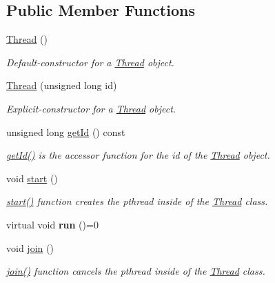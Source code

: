 \subsection*{Public Member Functions}
\begin{DoxyCompactItemize}
\item 
\hyperlink{class_thread_a95c703fb8f2f27cb64f475a8c940864a}{Thread} ()
\begin{DoxyCompactList}\small\item\em Default-\/constructor for a \hyperlink{class_thread}{Thread} object. \end{DoxyCompactList}\item 
\hyperlink{class_thread_a4b0b62961ddc8eedec7be379118d0588}{Thread} (unsigned long id)
\begin{DoxyCompactList}\small\item\em Explicit-\/constructor for a \hyperlink{class_thread}{Thread} object. \end{DoxyCompactList}\item 
unsigned long \hyperlink{class_thread_aca302203fb0d46f6ea42bb49f689f6a6}{get\+Id} () const
\begin{DoxyCompactList}\small\item\em \hyperlink{class_thread_aca302203fb0d46f6ea42bb49f689f6a6}{get\+Id()} is the accessor function for the id of the \hyperlink{class_thread}{Thread} object. \end{DoxyCompactList}\item 
void \hyperlink{class_thread_a1f53ee62bd30a7924186ef26150ce262}{start} ()
\begin{DoxyCompactList}\small\item\em \hyperlink{class_thread_a1f53ee62bd30a7924186ef26150ce262}{start()} function creates the pthread inside of the \hyperlink{class_thread}{Thread} class. \end{DoxyCompactList}\item 
\mbox{\label{class_thread_aae90dfabab3e1776cf01a26e7ee3a620}} 
virtual void {\bfseries run} ()=0
\item 
void \hyperlink{class_thread_a4d9d788e98388a3217831a9046709deb}{join} ()
\begin{DoxyCompactList}\small\item\em \hyperlink{class_thread_a4d9d788e98388a3217831a9046709deb}{join()} function cancels the pthread inside of the \hyperlink{class_thread}{Thread} class. \end{DoxyCompactList}\item 

\end{DoxyCompactItemize}
